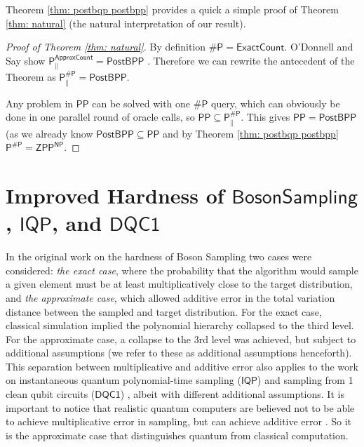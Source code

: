 \documentclass{article}
\begin{document}
Theorem \ref{thm: postbqp postbpp} provides a quick a simple proof of Theorem \ref{thm: natural} (the natural interpretation of our result).

\begin{proof}[Proof of Theorem \ref{thm: natural}]
By definition $\mathsf{\#P=ExactCount}$. O'Donnell and Say show $\mathsf{P^{ApproxCount}_{\parallel}=PostBPP}$ \cite{o2018weakness}. 
Therefore we can rewrite the antecedent of the Theorem as $\mathsf{P^{\#P}_\parallel=PostBPP}$.

Any problem in $\mathsf{PP}$ can be solved with one $\mathsf{\#P}$ query, which can obviously be done in one parallel round of oracle calls, so $\mathsf{PP\subseteq P^{\#P}_\parallel}$. This gives $\mathsf{PP=PostBPP}$ (as we already know $\mathsf{PostBPP\subseteq PP}$ and by Theorem \ref{thm: postbqp postbpp} $\mathsf{P^{\#P}=ZPP^{NP}}$.
\end{proof}


\section{Improved Hardness of $\mathsf{BosonSampling}$, $\mathsf{IQP}$, and $\mathsf{DQC1}$}\label{sect: quantum supremacy}

In the original work on the hardness of Boson Sampling \cite{aaronson2011computational} two cases were considered: \textit{the exact case}, where the probability that the algorithm would sample a given element must be at least multiplicatively close to the target distribution, and \textit{the approximate case}, which allowed additive error in the total variation distance between the sampled and target distribution. 
For the exact case, classical simulation implied the polynomial hierarchy collapsed to the third level. For the approximate case, a collapse to the 3rd level was achieved, but subject to additional assumptions (we refer to these as additional assumptions henceforth). This separation between multiplicative and additive error also applies to the work on instantaneous quantum polynomial-time sampling ($\mathsf{IQP}$) \cite{bremner2016average} and sampling from 1 clean qubit circuits ($\mathsf{DQC1}$) \cite{morimae2017hardness}, albeit with different additional assumptions.
It is important to notice that realistic quantum computers are believed not to be able to achieve multiplicative error in sampling, but can achieve additive error \cite{bremner2016average, aharonov2023polynomial}. So it is the approximate case that distinguishes quantum from classical computation.
\end{document}
